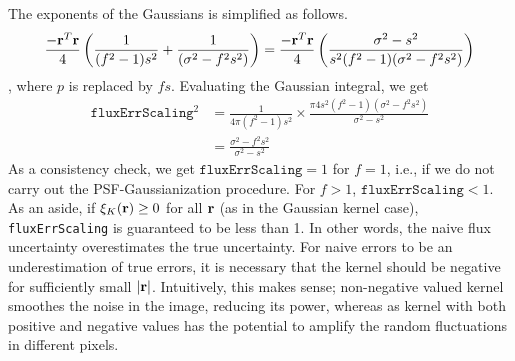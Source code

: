 \documentclass[DM,lsstdraft, authoryear,toc]{lsstdoc}
\begin{document}
The exponents of the Gaussians is simplified as follows.
\begin{equation}
  \frac{{-\bf r}^T{\bf r}}{4}\left(\frac{1}{(f^2-1)s^2} + \frac{1}{(\sigma^2-f^2s^2)} \right)
  = \frac{{-\bf r}^T{\bf r}}{4}\left( \frac{\sigma^2 - s^2}{s^2(f^2-1)(\sigma^2-f^2s^2)} \right)
\end{equation},
where $p$ is replaced by $fs$. Evaluating the Gaussian integral, we get
\begin{align}
  \texttt{fluxErrScaling}^2 &= \frac{1}{4\pi (f^2-1)s^2} \times \frac{\pi 4s^2(f^2-1)(\sigma^2-f^2s^2)}{\sigma^2-s^2} \\
  &= \frac{\sigma^2-f^2s^2}{\sigma^2-s^2}
\end{align}
As a consistency check, we get $\texttt{fluxErrScaling} = 1$ for $f=1$, i.e., if we do not carry out the PSF-Gaussianization procedure. For $f>1$, $\texttt{fluxErrScaling} < 1$. As an aside, if $\xi_K({\bf r}) \ge 0$ for all ${\bf r}$ (as in the Gaussian kernel case), \texttt{fluxErrScaling} is guaranteed to be less than 1. In other words, the naive flux uncertainty overestimates the true uncertainty. For naive errors to be an underestimation of true errors, it is necessary that the kernel should be negative for sufficiently small $|{\bf r}|$. Intuitively, this makes sense; non-negative valued kernel smoothes the noise in the image, reducing its power, whereas as kernel with both positive and negative values has the potential to amplify the random fluctuations in different pixels.
\end{document}
